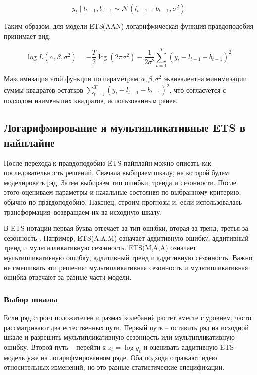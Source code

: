\documentclass[12pt,fleqn]{article}
\begin{document}
\begin{equation}
  y_t \mid l_{t-1}, b_{t-1} \sim \mathcal{N}(l_{t-1} + b_{t-1}, \sigma^2)
\end{equation}

Таким образом, для модели ETS(AAN) логарифмическая функция правдоподобия принимает вид:

\begin{equation}
  \log L(\alpha, \beta, \sigma^2) = -\frac{T}{2} \log(2\pi\sigma^2) - \frac{1}{2\sigma^2} \sum_{t=1}^{T} (y_t - l_{t-1} - b_{t-1})^2
\end{equation}

Максимизация этой функции по параметрам $\alpha, \beta, \sigma^2$ эквивалентна минимизации суммы квадратов остатков $\sum_{t=1}^{T} (y_t - l_{t-1} - b_{t-1})^2$, что согласуется с подходом наименьших квадратов, использованным ранее.

\subsection{Логарифмирование и мультипликативные ETS в пайплайне}

После перехода к правдоподобию ETS-пайплайн можно описать как последовательность решений.
Сначала выбираем шкалу, на которой будем моделировать ряд.
Затем выбираем тип ошибки, тренда и сезонности.
После этого оцениваем параметры и начальные состояния по выбранному критерию, обычно по правдоподобию.
Наконец, строим прогнозы и, если использовалась трансформация, возвращаем их на исходную шкалу.

В ETS-нотации первая буква отвечает за тип ошибки, вторая за тренд, третья за сезонность \cite{hyndman2021,forecastets}.
Например, ETS(A,A,M) означает аддитивную ошибку, аддитивный тренд и мультипликативную сезонность.
ETS(M,A,A) означает мультипликативную ошибку, аддитивный тренд и аддитивную сезонность.
Важно не смешивать эти решения: мультипликативная сезонность и мультипликативная ошибка отвечают за разные части модели.

\subsubsection{Выбор шкалы}

Если ряд строго положителен и размах колебаний растет вместе с уровнем, часто рассматривают два естественных пути.
Первый путь -- оставить ряд на исходной шкале и разрешить мультипликативную сезонность или мультипликативную ошибку.
Второй путь -- перейти к \(z_t=\log y_t\) и оценивать аддитивную ETS-модель уже на логарифмированном ряде.
Оба подхода отражают идею относительных изменений, но это разные статистические спецификации.
\end{document}
